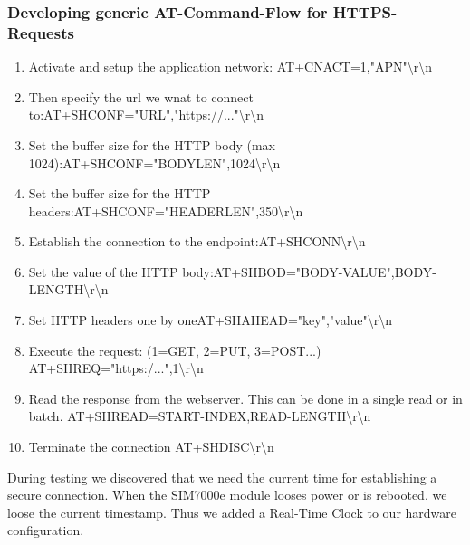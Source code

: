 \subsubsection{Developing generic AT-Command-Flow for HTTPS-Requests}
\begin{enumerate}
    \item  Activate and setup the application network: \newline{}AT+CNACT=1,"APN"\textbackslash{}r\textbackslash{}n
    \item  Then specify the url we wnat to connect to:\newline{}AT+SHCONF="URL","https://..."\textbackslash{}r\textbackslash{}n
    \item  Set the buffer size for the HTTP body (max 1024):\newline{}AT+SHCONF="BODYLEN",1024\textbackslash{}r\textbackslash{}n
    \item Set the buffer size for the HTTP headers:\newline{}AT+SHCONF="HEADERLEN",350\textbackslash{}r\textbackslash{}n
    \item Establish the connection to the endpoint:\newline{}AT+SHCONN\textbackslash{}r\textbackslash{}n
    \item Set the value of the HTTP body:\newline{}AT+SHBOD="BODY-VALUE",BODY-LENGTH\textbackslash{}r\textbackslash{}n
    \item Set HTTP headers one by one\newline{}AT+SHAHEAD="key","value"\textbackslash{}r\textbackslash{}n
    \item Execute the request: (1=GET, 2=PUT, 3=POST...)\cite{SIM7000E_HTTPS_APPLICATION_NOTE} \newline{}AT+SHREQ="https:/...",1\textbackslash{}r\textbackslash{}n
    \item Read the response from the webserver. This can be done in a single read or in batch. \newline{}AT+SHREAD=START-INDEX,READ-LENGTH\textbackslash{}r\textbackslash{}n
    \item Terminate the connection \newline{}AT+SHDISC\textbackslash{}r\textbackslash{}n
\end{enumerate}

During testing we discovered that we need the current time for establishing a secure connection. When the SIM7000e module looses power or is rebooted, we loose the current timestamp. Thus we added a Real-Time Clock to our hardware configuration.

